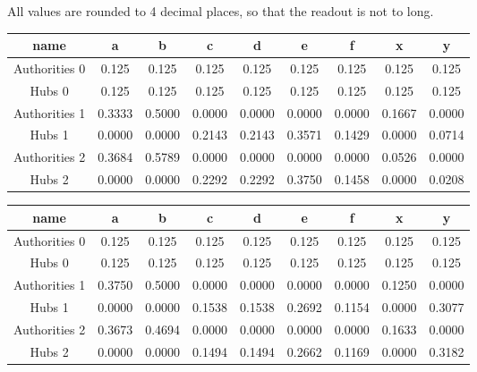 \documentclass{article}
\begin{document}
All values are rounded to 4 decimal places, so that the readout is not to long.

\begin{center}
\begin{tabular}{c|c|c|c|c|c|c|c|c}
name & a & b & c & d & e & f & x & y \\
\hline
Authorities 0 & 0.125 & 0.125 & 0.125 & 0.125 & 0.125 & 0.125 & 0.125 & 0.125 \\
Hubs        0 & 0.125 & 0.125 & 0.125 & 0.125 & 0.125 & 0.125 & 0.125 & 0.125 \\
Authorities 1 & 0.3333 & 0.5000 & 0.0000 & 0.0000 & 0.0000 & 0.0000 & 0.1667 & 0.0000 \\
Hubs        1 & 0.0000 & 0.0000 & 0.2143 & 0.2143 & 0.3571 & 0.1429 & 0.0000 & 0.0714 \\
Authorities 2 & 0.3684 & 0.5789 & 0.0000 & 0.0000 & 0.0000 & 0.0000 & 0.0526 & 0.0000 \\
Hubs        2 & 0.0000 & 0.0000 & 0.2292 & 0.2292 & 0.3750 & 0.1458 & 0.0000 & 0.0208 \\
\end{tabular}
\end{center}
\bigskip

\begin{center}
\begin{tabular}{c|c|c|c|c|c|c|c|c}
name & a & b & c & d & e & f & x & y \\
\hline
Authorities 0 & 0.125 & 0.125 & 0.125 & 0.125 & 0.125 & 0.125 & 0.125 & 0.125 \\
Hubs        0 & 0.125 & 0.125 & 0.125 & 0.125 & 0.125 & 0.125 & 0.125 & 0.125 \\
Authorities 1 & 0.3750 & 0.5000 & 0.0000 & 0.0000 & 0.0000 & 0.0000 & 0.1250 & 0.0000 \\
Hubs        1 & 0.0000 & 0.0000 & 0.1538 & 0.1538 & 0.2692 & 0.1154 & 0.0000 & 0.3077 \\
Authorities 2 & 0.3673 & 0.4694 & 0.0000 & 0.0000 & 0.0000 & 0.0000 & 0.1633 & 0.0000 \\
Hubs        2 & 0.0000 & 0.0000 & 0.1494 & 0.1494 & 0.2662 & 0.1169 & 0.0000 & 0.3182 \\
\end{tabular}
\end{center}
\end{document}
